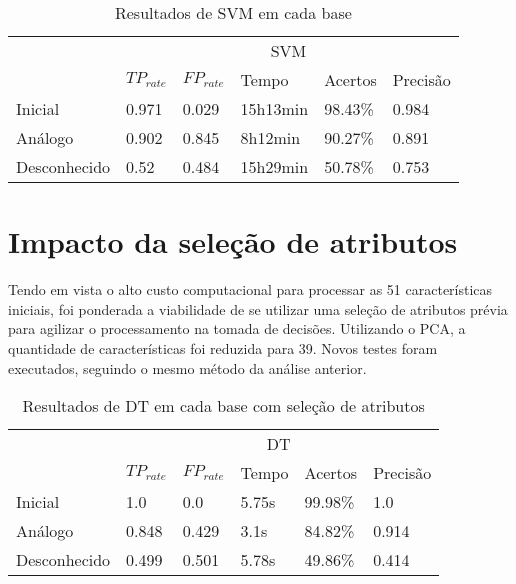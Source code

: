 \begin{table}[h]
    \centering
    \caption{Resultados de SVM em cada base}
    \label{tab:svm}
    \begin{tabular}{l|l|l|l|l|l|}
        \cline{2-6}
                                                                   & \multicolumn{5}{c|}{\cellcolor[HTML]{C0C0C0}SVM}          \\ \cline{2-6}
                                                                   & $TP_{rate}$ & $FP_{rate}$ & Tempo    & Acertos & Precisão \\ \hline
        \multicolumn{1}{|l|}{\cellcolor[HTML]{EFEFEF}Inicial}      & 0.971       & 0.029       & 15h13min & 98.43\%  & 0.984     \\ \hline
        \multicolumn{1}{|l|}{\cellcolor[HTML]{EFEFEF}Análogo}      & 0.902       & 0.845       & 8h12min  & 90.27\%  & 0.891    \\ \hline
        \multicolumn{1}{|l|}{\cellcolor[HTML]{EFEFEF}Desconhecido} & 0.52        & 0.484       & 15h29min & 50.78\%  & 0.753     \\ \hline
    \end{tabular}
\end{table}



\section{Impacto da seleção de atributos}
Tendo em vista o alto custo computacional para processar as 51 características iniciais, foi ponderada a viabilidade
de se utilizar uma seleção de atributos prévia para agilizar o processamento na tomada de decisões. Utilizando o
PCA, a quantidade de características foi reduzida para 39. Novos testes foram executados, seguindo o mesmo método da
análise anterior.

\begin{table}[h]
    \centering
    \caption{Resultados de DT em cada base com seleção de atributos}
    \label{tab:dtattrless}
    \begin{tabular}{l|l|l|l|l|l|}
        \cline{2-6}
                                                                   & \multicolumn{5}{c|}{\cellcolor[HTML]{EFEFEF}DT}        \\ \cline{2-6}
                                                                   & $TP_{rate}$ & $FP_{rate}$ & Tempo & Acertos & Precisão \\ \hline
        \multicolumn{1}{|l|}{\cellcolor[HTML]{EFEFEF}Inicial}      & 1.0         & 0.0         & 5.75s & 99.98\% & 1.0      \\ \hline
        \multicolumn{1}{|l|}{\cellcolor[HTML]{EFEFEF}Análogo}      & 0.848       & 0.429       & 3.1s  & 84.82\% & 0.914    \\ \hline
        \multicolumn{1}{|l|}{\cellcolor[HTML]{EFEFEF}Desconhecido} & 0.499       & 0.501       & 5.78s & 49.86\% & 0.414    \\ \hline
    \end{tabular}
\end{table}

